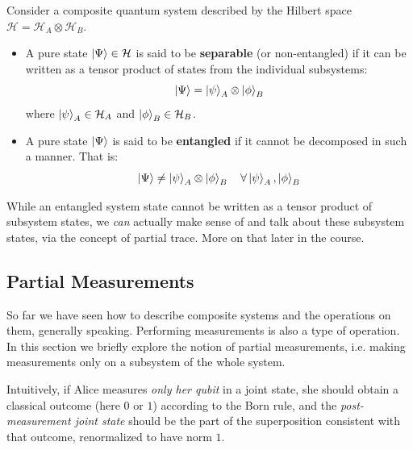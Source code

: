 \begin{definition}
Consider a composite quantum system described by the Hilbert space $\mathcal{H} = \mathcal{H}_A \otimes \mathcal{H}_B$. 
\begin{itemize}
    \item A pure state $\ket{\Psi} \in \mathcal{H}$ is said to be \textbf{separable} (or non-entangled) if it can be written as a tensor product of states from the individual subsystems:
    $$\ket{\Psi} = \ket{\psi}_A \otimes \ket{\phi}_B$$
    where $\ket{\psi}_A \in \mathcal{H}_A$ and $\ket{\phi}_B \in \mathcal{H}_B$.
    
    \item A pure state $\ket{\Psi}$ is said to be \textbf{entangled} if it cannot be decomposed in such a manner. That is:
    $$\ket{\Psi} \neq \ket{\psi}_A \otimes \ket{\phi}_B \quad \forall \ket{\psi}_A, \ket{\phi}_B$$
\end{itemize}
\end{definition}

While an entangled system state cannot be written as a tensor product of subsystem states, we \textit{can} actually make sense of and talk about these subsystem states, via the concept of partial trace. More on that later in the course.

\subsection{Partial Measurements}

So far we have seen how to describe composite systems and the operations on them, generally speaking. Performing measurements is also a type of operation. In this section we briefly explore the notion of partial measurements, i.e. making measurements only on a subsystem of the whole system.

Intuitively, if Alice measures \emph{only her qubit} in a joint state, she should obtain a classical outcome (here $0$ or $1$) according to the Born rule, and the \emph{post-measurement joint state} should be the part of the superposition consistent with that outcome, renormalized to have norm $1$.

